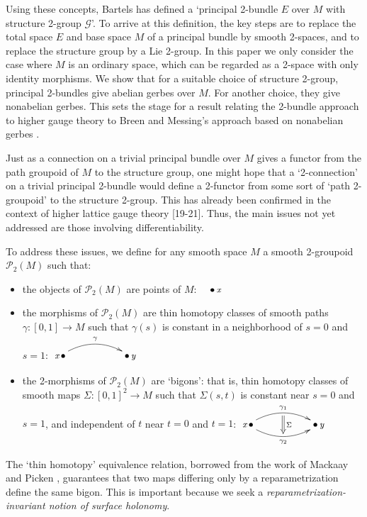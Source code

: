 \documentclass{article}
\newcommand{\maps}{\colon}
\renewcommand{\P}{\mathcal{P}}
\def\twogroup {\mathcal{G}}
\begin{document}
Using these concepts, Bartels \cite{Bartels:2004} has defined 
a `principal 2-bundle $E$ over $M$ with structure 
2-group $\twogroup$'.  To arrive at this definition, the 
key steps are to replace the total space $E$ and base space $M$ of
a principal bundle by smooth 2-spaces, and to replace the structure 
group by a Lie 2-group.  In this paper we only consider the case where 
$M$ is an ordinary space, which can be regarded as a 2-space with only 
identity morphisms.  We show that for a suitable choice of structure 
2-group, principal 2-bundles give abelian gerbes over $M$.  For another
choice, they give nonabelian gerbes.  This sets the stage for a result 
relating the 2-bundle approach to higher gauge theory to Breen and 
Messing's approach based on nonabelian gerbes \cite{BreenMessing:2001}.

Just as a connection on a trivial principal bundle over $M$ gives a 
functor from the path groupoid of $M$ to the structure group, one 
might hope that a `2-connection' on a trivial principal 2-bundle would 
define a 2-functor from some sort of `path 2-groupoid' to the structure 
2-group.  This has already been confirmed in the context of higher lattice 
gauge theory [19-21].
Thus, the main issues not yet addressed are those involving differentiability. 

To address these issues, we define for any smooth space $M$ a smooth 
2-groupoid $\P_2(M)$ such that:
\begin{itemize}
\item
the objects of $\P_2(M)$ are points of $M$: 
$ \quad   \bullet \, {\textstyle{\small{\textit{x}}}}   $
\item 
the morphisms of $\P_2(M)$ are thin homotopy classes of
smooth paths $\gamma \maps [0,1] \to M$ such that $\gamma(s)$ 
is constant in a neighborhood of $s = 0$ and $s = 1$:
$
\xymatrix{
 {\textstyle{\small{\textit{x}}}}  \,
   \bullet \ar@/^1pc/[rr]^{\gamma}
&& \bullet \, {\textstyle{\small{\textit{y}}}}   
}
$
\item 
the 2-morphisms of $\P_2(M)$ are `bigons': that is,
thin homotopy classes of smooth maps 
$\Sigma \maps [0,1]^2 \to M$ such that $\Sigma(s,t)$ is 
constant near $s = 0$ and $s = 1$, and 
independent of $t$ near $t = 0$ and $t = 1$:
$
\xymatrix{
 {\textstyle{\small{\textit{x}}}} \, 
   \bullet \ar@/^1pc/[rr]^{\gamma_1}_{}="0"
           \ar@/_1pc/[rr]_{\gamma_2}^{}="1"
&& \bullet \, {\textstyle{\small{\textit{y}}}}   
\ar@{=>}"0";"1"^{\Sigma}
}
$
\end{itemize}
The `thin homotopy' equivalence relation, borrowed from the work
of Mackaay and Picken \cite{MackaayPicken:2000,Mackaay:2001}, 
guarantees that two maps differing only by a reparametrization 
define the same bigon.  This is important because we seek a 
{\it reparametrization-invariant notion of surface holonomy}.
\end{document}
